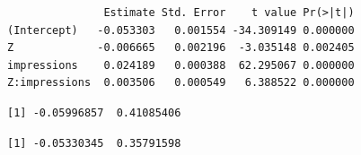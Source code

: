 \begin{verbatim}
               Estimate Std. Error    t value Pr(>|t|)
(Intercept)   -0.053303   0.001554 -34.309149 0.000000
Z             -0.006665   0.002196  -3.035148 0.002405
impressions    0.024189   0.000388  62.295067 0.000000
Z:impressions  0.003506   0.000549   6.388522 0.000000
\end{verbatim}

\begin{Shaded}
\begin{Highlighting}[]
\OtherTok{\textless{}{-}} 
\OtherTok{\textless{}{-}} \SpecialCharTok{:}\SpecialCharTok{$}
\OtherTok{\textless{}{-}}\NormalTok{ cc[[}\NormalTok{]] }\SpecialCharTok{+}\NormalTok{ cc[[}\NormalTok{]] }\SpecialCharTok{+}
\NormalTok{      (cc[[}\NormalTok{]] }\SpecialCharTok{+}\NormalTok{ cc[[}\NormalTok{]]) }\SpecialCharTok{*}
\OtherTok{\textless{}{-}}\NormalTok{ cc[[}\NormalTok{]] }\SpecialCharTok{+}\NormalTok{ cc[[}\NormalTok{]] }\SpecialCharTok{*}

\end{Highlighting}
\end{Shaded}

\begin{verbatim}
[1] -0.05996857  0.41085406
\end{verbatim}

\begin{Shaded}
\begin{Highlighting}[]
\end{Highlighting}
\end{Shaded}

\begin{verbatim}
[1] -0.05330345  0.35791598
\end{verbatim}

\begin{Shaded}
\begin{Highlighting}[]
\OtherTok{\textless{}{-}}\SpecialCharTok{{-}}
\NormalTok{(} \NormalTok{(}\NormalTok{, }\NormalTok{, }\NormalTok{, }\NormalTok{, }\NormalTok{, }\NormalTok{),}
           \NormalTok{ tau\_lin[}\NormalTok{(}\NormalTok{, }\NormalTok{, }\NormalTok{, }\NormalTok{, }\NormalTok{, }\NormalTok{) }\SpecialCharTok{+} \NormalTok{])}
\end{Highlighting}
\end{Shaded}

